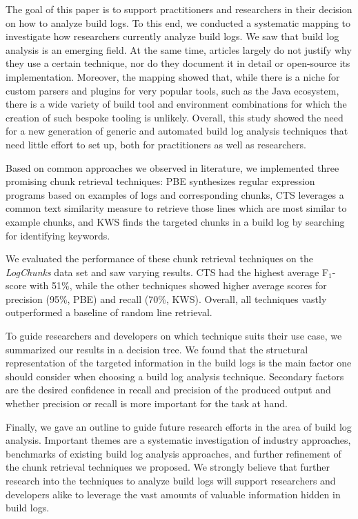 The goal of this paper is to support practitioners and researchers in
their decision on how to analyze build logs.
To this end, we
conducted a systematic mapping to investigate how researchers
currently analyze build logs.
We saw that build log analysis is an emerging field.
At the same time, articles largely do not justify why
they use a certain technique, nor do they document it in detail or
open-source its implementation.
Moreover, the mapping showed that,
while there is a niche for custom parsers and plugins for very popular
tools, such as the Java ecosystem, there is a wide variety of build
tool and environment combinations for which the creation of such
bespoke tooling is unlikely.
Overall, this study showed the need for a new
generation of generic and automated build log analysis techniques that
need little effort to set up, both for practitioners as well as
researchers.

Based on common approaches we observed in literature,
we implemented three promising chunk retrieval techniques:
PBE synthesizes regular expression programs based on examples of logs
and corresponding chunks, CTS leverages a common text similarity
measure to retrieve those lines which are most similar to example
chunks, and KWS finds the targeted chunks in a build log by searching
for identifying keywords.

We evaluated the performance of these chunk retrieval techniques on the
\emph{LogChunks} data set and saw varying results.
CTS had the highest average F$_{1}$-score with 51\%, while the other
techniques showed higher average scores for precision (95\%, PBE) and
recall (70\%, KWS).
Overall, all techniques vastly outperformed a
baseline of random line retrieval.

To guide researchers and developers on which technique suits their
use case,
we summarized our results in a decision tree.
We found
that the structural representation of the targeted information in the
build logs is the main factor one should consider when
choosing a build log analysis
technique.
Secondary factors are the desired confidence in recall and
precision of the produced output and whether precision or recall is
more important for the task at hand.

Finally, we gave an
outline to guide future research efforts in the area of build log
analysis.
Important themes are a systematic investigation of industry approaches,
benchmarks of existing build log analysis approaches, and further
refinement of the chunk retrieval techniques we proposed.
We strongly believe that further research into the techniques to
analyze build logs will support researchers and developers alike to
leverage the vast amounts of valuable information hidden
in build logs.


